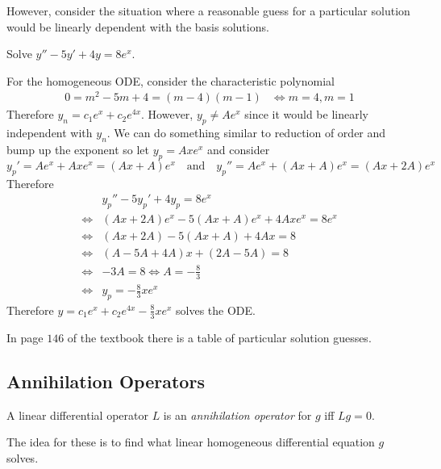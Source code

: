 \documentclass[notes]{subfiles}
\begin{document}
However, consider the situation where a reasonable guess for a particular solution would be linearly dependent with the basis solutions.

\begin{exercise} \label{linearly_dep_part_sol}
    Solve $y'' - 5y' + 4y = 8e^x$.
\end{exercise}
\begin{solution}
    For the homogeneous ODE, consider the characteristic polynomial
    \begin{align*}
        0 = m^2 - 5m + 4 = (m - 4)(m - 1)
        &\iff m = 4, m = 1
    \end{align*}
    Therefore $y_n = c_1e^x + c_2e^{4x}$.
    However, $y_p \neq Ae^x$ since it would be linearly independent with $y_n$. We can do something similar to reduction of order and bump up the exponent so let $y_p = Axe^x$ and consider
    \[
        y_p' = Ae^x + Axe^x = (Ax + A)e^x \quad \text{and} \quad y_p'' = Ae^x + (Ax + A)e^x = (Ax + 2A)e^x
    \]
    Therefore
    \begin{align*}
        &y_p'' - 5y_p' + 4y_p = 8e^x \\
        \iff& (Ax + 2A)e^x - 5(Ax + A)e^x + 4Axe^x = 8e^x \\
        \iff& (Ax + 2A) - 5(Ax + A) + 4Ax = 8 \\
        \iff& (A - 5A + 4A)x + (2A - 5A) = 8 \\
        \iff& -3A = 8 \iff A = -\frac{8}{3} \\
        \iff& y_p = -\frac{8}{3}xe^x
    \end{align*}
    Therefore $y = c_1e^x + c_2e^{4x} - \frac{8}{3}xe^x$ solves the ODE.
\end{solution}

In page $146$ of the textbook there is a table of particular solution guesses.

\subsection{Annihilation Operators}

\begin{definition}
    A linear differential operator $L$ is an \textsl{annihilation operator} for $g$ iff $Lg = 0$. 
\end{definition}

The idea for these is to find what linear homogeneous differential equation $g$ solves.
\end{document}
